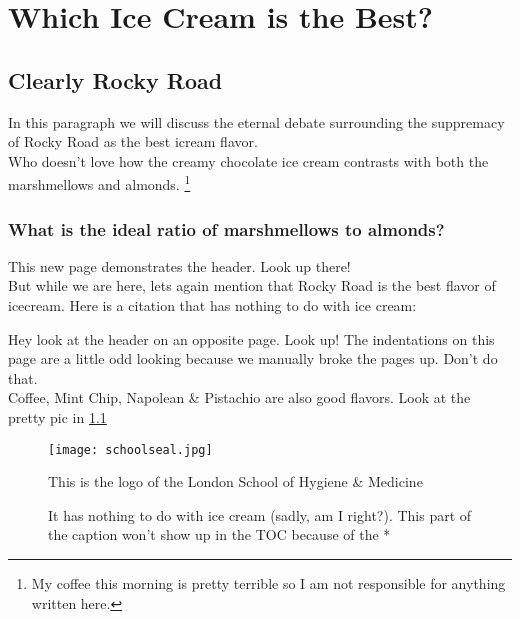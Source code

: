 \chapter{Which Ice Cream is the Best?}

\section{Clearly Rocky Road}
In this paragraph we will discuss the eternal debate surrounding the suppremacy of Rocky Road as the best icream flavor. \\

Who doesn't love how the creamy chocolate ice cream contrasts with both the marshmellows and almonds. \footnote{My coffee this morning is pretty terrible so I am not responsible for anything written here.}

\subsection{What is the ideal ratio of marshmellows to almonds?}

\newpage

This new page demonstrates the header. Look up there! \\

But while we are here, lets again mention that Rocky Road is the best flavor of icecream. Here is a citation that has nothing to do with ice cream: \cite{Yman2016}

\newpage

Hey look at the header on an opposite page. Look up! The indentations on this page are a little odd looking because we manually broke the pages up. Don't do that. \\

Coffee, Mint Chip, Napolean \& Pistachio are also good flavors. Look at the pretty pic in \ref{fig:logo}

\begin{figure} 
  \texttt{[image: schoolseal.jpg]} %
  \caption{This is the logo of the London School of Hygiene \& Medicine}
  \caption*{It has nothing to do with ice cream (sadly, am I right?). 
            This part of the caption won't show up in the TOC because of the *
            }
  \label{fig:logo}
\end{figure}

